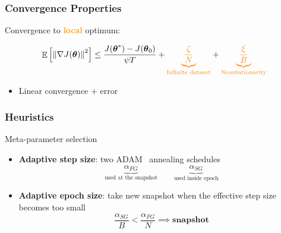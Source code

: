 \documentclass[aspectratio=169]{beamer}
\newcommand{\enb}[1]{\textcolor{poliblue1}{\textbf{#1}}}
\newcommand{\eno}[1]{\textcolor{orange}{\textbf{#1}}}
\DeclareMathOperator*{\EV}{\mathbb{E}}
\newcommand{\EVV}[2][\ppvect \in \ppspace]{\EV_{#1}\left[{#2}\right]}
\newcommand{\norm}[2][\infty]{\left\|#2\right\|_{#1}}
\newcommand{\vtheta}{\boldsymbol{\theta}}
\begin{document}
\begin{frame} 
\frametitle{Convergence Properties} 
Convergence to \eno{local} optimum:

\Large{
\begin{equation*}
	\EVV[]
	{\norm[]{\nabla J(\vtheta)}^2} 
	\leq
	\frac{J(\vtheta^*)-J(\vtheta_0)}{\psi T} +
	\textcolor{orange}{\underbrace{\frac{\zeta}{N}}_{\text{Infinite dataset}}}
	+\textcolor{orange}{\underbrace{\frac{\xi}{B}}_{\text{Nonstationarity}}}
\end{equation*}
}

\begin{itemize}
	\item Linear convergence $+$ error~\citep [similar to][]{harikandeh2015stopwasting}
\end{itemize}

\end{frame}

\begin{frame} 
\frametitle{Heuristics} 
Meta-parameter selection

\begin{itemize}
	\item \enb{Adaptive step size}: two ADAM~\citep{kingma2014adam} annealing schedules
	 \begin{equation*}
	 	\underbrace{\alpha_{FG}}_{\text{used at the snapshot}} \qquad \underbrace{\alpha_{SG}}_{\text{used inside epoch}}
	 \end{equation*}
	\item \enb{Adaptive epoch size}: take new snapshot when the effective step size becomes too small
	\begin{equation*}
		\frac{\alpha_{SG}}{B} < \frac{\alpha_{FG}}{N} \implies \textbf{snapshot}
	\end{equation*}
\end{itemize}

\end{frame}
\end{document}
